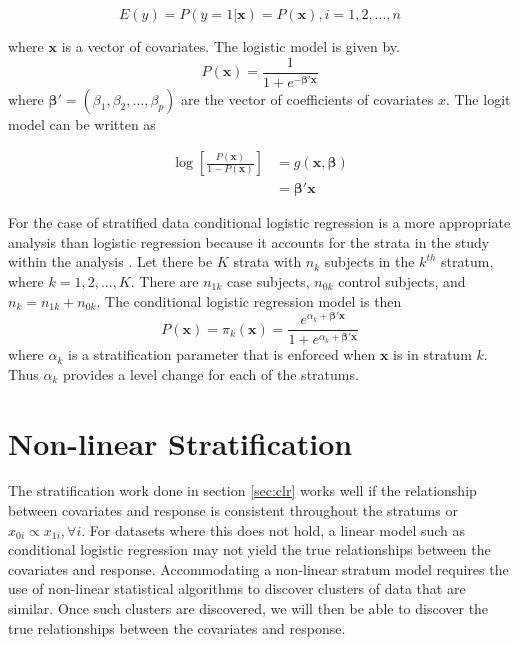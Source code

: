  \begin{equation} \label{eqn:probx}
E(y)= P(y=1|\mathbf{x})=P(\mathbf{x}), i =1,2,...,n
\end{equation}

where $\mathbf{x}$ is a vector of covariates. The logistic model is given by. 
\begin{equation} \label{eqn:logisticfunction}
P(\mathbf{x})= \frac{1}{1+e^{-\mathbf{\beta}'\mathbf{x}}}
\end{equation}
where $\mathbf{\beta}'=(\beta_1,\beta_2,...,\beta_p)$ are the vector of coefficients of covariates $x$. The logit model can be written as 

\begin{equation} \label{eqn:logisticmodel}
\begin{array}{cc}
\log \left[ \frac{P(\mathbf{x})}{1-P(\mathbf{x})} \right]  &= g(\mathbf{x},\mathbf{\beta})\\
&= \mathbf{\beta}'\mathbf{x}
\end{array}
\end{equation}

For the case of stratified data conditional logistic regression is a more appropriate analysis than logistic regression because it accounts for the strata in the study within the analysis \citep{Jewell04}. Let there be $K$ strata with $n_k$ subjects in the $k^{th}$ stratum, where $k=1,2,...,K$. There are $n_{1k}$ case subjects, $n_{0k}$ control subjects, and $n_k=n_{1k}+n_{0k}$. The conditional logistic regression model is then 
\begin{equation} \label{eqn:clrmodel}
P(\mathbf{x})=\pi_k(\mathbf{x})= \frac{e^{\alpha_k + \mathbf{\beta}'\mathbf{x}}}{1+e^{\alpha_k + \mathbf{\beta}'\mathbf{x}}}
\end{equation}
where $\alpha_k$ is a stratification parameter that is enforced when $\mathbf{x}$ is in stratum $k$. Thus $\alpha_k$ provides a level change for each of the stratums. 

\section{Non-linear Stratification}
The stratification work done in section \ref{sec:clr} works well if the relationship between covariates and response is consistent throughout the stratums or $x_{0i} \propto x_{1i}, \forall i$. For datasets where this does not hold, a linear model such as conditional logistic regression may not yield the true relationships between the covariates and response. Accommodating a non-linear stratum model requires the use of non-linear statistical algorithms to discover clusters of data that are similar. Once such clusters are discovered, we will then be able to discover the true relationships between the covariates and response. 

